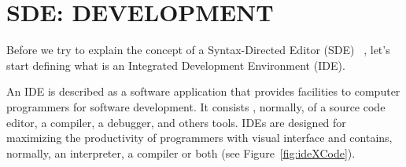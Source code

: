 \documentclass[
  oneside,
  11pt, a4paper,
  footinclude=true,
  headinclude=true,
  cleardoublepage=empty
]{scrbook}
\begin{document}





\chapter{SDE: DEVELOPMENT}

Before we try to explain the concept of a Syntax-Directed Editor (SDE) ~\citep{RT89b,Ko05,alsCH10a,TR81a,RMT86a,RT89a,AHW89}, let's start defining what is an Integrated Development Environment (IDE).

An IDE is described as a software application that provides facilities to computer programmers for software development. It consists , normally, of a source code editor, a compiler, a debugger, and others tools.
IDEs are designed for maximizing the productivity of programmers with visual interface and contains, normally, an interpreter, a compiler or both (see Figure~\ref{fig:ideXCode}).
\end{document}
